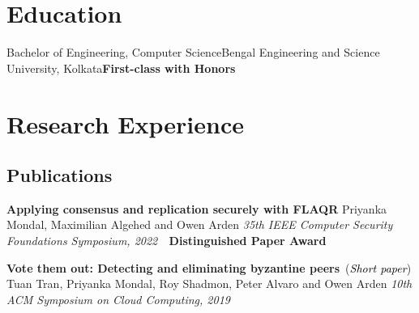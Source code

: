\documentclass[9pt,a4paper]{moderncv}
\begin{document}
\makecvtitle
\vspace{-1cm}
\section{Education}
\vspace{0.2cm}
{Bachelor of Engineering, Computer Science}{Bengal Engineering and Science University, Kolkata}{}{\textbf{First-class with Honors}}{}
\section{Research Experience}
\vspace{0.1cm}
\hspace{-0.1cm}
\hspace{-0.1cm}
\subsection{Publications}
\begin{etaremune}
\item{\textbf{Applying consensus and replication securely with FLAQR}}
\newline Priyanka Mondal, Maximilian Algehed and Owen Arden \newline
\textit{35th IEEE Computer Security Foundations Symposium, 2022~~}{\textbf{\textsf{\textcolor{bittersweet}{Distinguished Paper Award}}}}
\item{\textbf{Vote them out: Detecting and eliminating byzantine peers}}~({\textit{\textsf{\textcolor{black}{Short paper}}}})
\newline Tuan Tran, Priyanka Mondal, Roy Shadmon, Peter Alvaro and Owen Arden \newline
\textit{10th ACM Symposium on Cloud Computing, 2019~~}
\end{etaremune}
\end{document}
